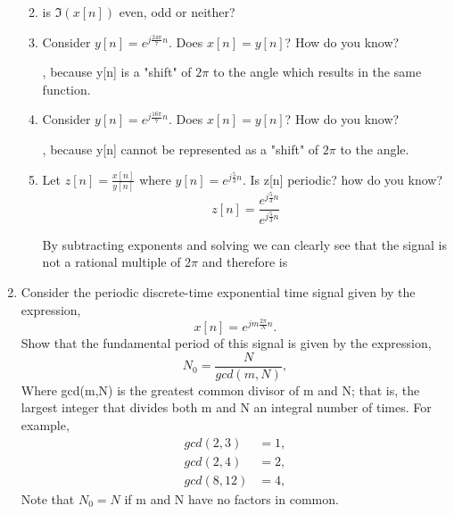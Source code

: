 \documentclass{article}
\begin{document}
\begin{enumerate}
\begin{enumerate}
\begin{center}
    \end{center}
    \item is $\Im(x[n])$ even, odd or neither?
    \begin{center}
    \end{center}
    \item Consider $y[n] = e^{j\frac{24\pi}{7}n}$. Does $x[n] = y[n]$? How do you know?
    \begin{center} 
        , because y[n] is a "shift" of $2\pi$ to the angle which results in the same function.
    \end{center}
    \item Consider $y[n] = e^{j\frac{16\pi}{7}n}$. Does $x[n] = y[n]$? How do you know?
    \begin{center} 
        , because y[n] cannot be represented as a "shift" of $2\pi$ to the angle.
    \end{center}
    \item Let $z[n] = \frac{x[n]}{y[n]}$ where $y[n] = e^{j\frac{5}{3}n}$. Is z[n] periodic? how do you know?
    \begin{equation}
        z[n] = \frac{e^{j\frac{5}{3}n}}{e^{j\frac{5}{3}n}} 
    \end{equation}
    \begin{center}
        By subtracting exponents and solving we can clearly see that the signal is not a rational multiple of 2$\pi$ and therefore is 
    \end{center}
\end{enumerate} 
\newpage
\item Consider the periodic discrete-time exponential time signal given by the expression,
\begin{equation}
    x[n] = e^{jm\frac{2\pi}{N}n}.
\end{equation}
Show that the fundamental period of this signal is given by the expression,
\begin{equation}
    N_0 = \frac{N}{gcd(m,N)},
\end{equation}
Where gcd(m,N) is the greatest common divisor of m and N; that is, the largest integer that divides both m and N an integral number of times. For example,
\begin{align}
    gcd(2,3) &= 1,\\
    gcd(2,4) &= 2,\\
    gcd(8,12) &= 4,
\end{align}
Note that $N_0 = N$ if m and N have no factors in common.

\end{enumerate}
\end{document}
